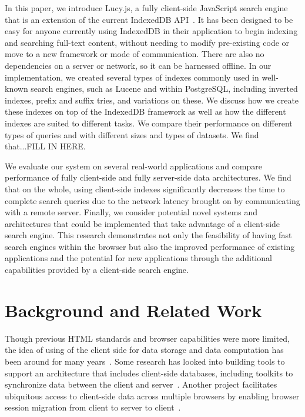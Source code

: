 \documentclass{vldb}
\begin{document}
In this paper, we introduce Lucy.js, a fully client-side JavaScript search engine that is an extension of the current IndexedDB API~\cite{indexeddb}. It has been designed to be easy for anyone currently using IndexedDB in their application to begin indexing and searching full-text content, without needing to modify pre-existing code or move to a new framework or mode of communication. There are also no dependencies on a server or network, so it can be harnessed offline. In our implementation, we created several types of indexes commonly used in well-known search engines, such as Lucene and within PostgreSQL, including inverted indexes, prefix and suffix tries, and variations on these. We discuss how we create these indexes on top of the IndexedDB framework as well as how the different indexes are suited to different tasks. We compare their performance on different types of queries and with different sizes and types of datasets. We find that...FILL IN HERE.

We evaluate our system on several real-world applications and compare performance of fully client-side and fully server-side data architectures. We find that on the whole, using client-side indexes significantly decreases the time to complete search queries due to the network latency brought on by communicating with a remote server.
Finally, we consider potential novel systems and architectures that could be implemented that take advantage of a client-side search engine.
This research demonstrates not only the feasibility of having fast search engines within the browser but also the improved performance of existing applications and the potential for new applications through the additional capabilities provided by a client-side search engine.



\section{Background and Related Work}

Though previous HTML standards and browser capabilities were more limited, the idea of using of the client side for data storage and data computation has been around for many years~\cite{bharat2000searchpad}. 
Some research has looked into building tools to support an architecture that includes client-side databases, including toolkits to synchronize data between the client and server~\cite{benson2010sync}. Another project facilitates ubiquitous access to client-side data across multiple browsers by enabling browser session migration from client to server to client~\cite{lo2013imagen}. 
\end{document}
